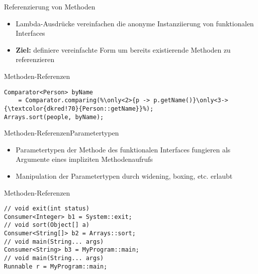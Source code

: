 \begin{frame}[fragile]{Referenzierung von Methoden}

    \begin{itemize}
        \item<1-> Lambda-Ausdrücke vereinfachen die anonyme Instanziierung von funktionalen 
        Interfaces
        \item<2-> \textbf{Ziel:} definiere vereinfachte Form um bereits existierende 
        Methoden zu referenzieren 
    \end{itemize}
    
    \pause

    \begin{center}
        \begin{minipage}[b]{0.75\textwidth}
            \begin{block}{Methoden-Referenzen \citep{goetz13}}
                \begin{lstlisting}
Comparator<Person> byName 
    = Comparator.comparing(%\only<2>{p -> p.getName()}\only<3->{\textcolor{dkred!70}{Person::getName}}%);
Arrays.sort(people, byName);
                \end{lstlisting}
            \end{block}
        \end{minipage}
    \end{center}
\end{frame}

\begin{frame}[fragile]{Methoden-Referenzen}{Parametertypen}
    \begin{itemize}
        \item<1-> Parametertypen der Methode des funktionalen Interfaces fungieren als Argumente
        eines impliziten Methodenaufrufs
        \item<2-> Manipulation der Parametertypen durch widening, boxing, etc. erlaubt
    \end{itemize}

    \pause

    \begin{center}
        \begin{minipage}[b]{0.75\textwidth}
            \begin{block}{Methoden-Referenzen \citep{goetz13}}
                \begin{lstlisting}
// void exit(int status)
Consumer<Integer> b1 = System::exit;
// void sort(Object[] a)
Consumer<String[]> b2 = Arrays::sort;  
// void main(String... args) 
Consumer<String> b3 = MyProgram::main;  
// void main(String... args)
Runnable r = MyProgram::main;           
                \end{lstlisting}
            \end{block}
        \end{minipage}
    \end{center}
\end{frame}

